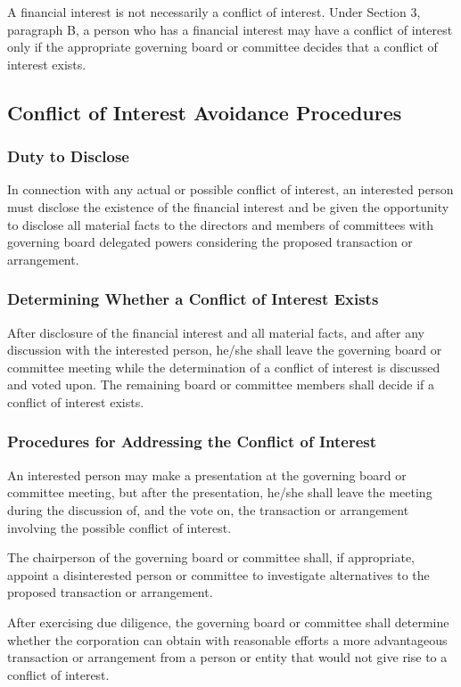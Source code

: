 \documentclass{article}
\begin{document}
		A financial interest is not necessarily a conflict of interest. Under Section 3, paragraph B, a person who has a financial interest may have a conflict of interest only if the appropriate governing board or committee decides that a conflict of interest exists.
	
	
	\subsection{Conflict of Interest Avoidance Procedures}
		\subsubsection{Duty to Disclose}
			In connection with any actual or possible conflict of interest, an interested person must disclose the existence of the financial interest and be given the opportunity to disclose all material facts to the directors and members of committees with governing board delegated powers considering the proposed transaction or arrangement.
		\subsubsection{Determining Whether a Conflict of Interest Exists}
		After disclosure of the financial interest and all material facts, and after any discussion with the interested person, he/she shall leave the governing board or committee meeting while the determination of a conflict of interest is discussed and voted upon. The remaining board or committee members shall decide if a conflict of interest exists.
		\subsubsection{Procedures for Addressing the Conflict of Interest}
		An interested person may make a presentation at the governing board or committee meeting, but after the presentation, he/she shall leave the meeting during the discussion of, and the vote on, the transaction or arrangement involving the possible conflict of interest.
		
		The chairperson of the governing board or committee shall, if appropriate, appoint a disinterested person or committee to investigate alternatives to the proposed transaction or arrangement.
		
		After exercising due diligence, the governing board or committee shall determine whether the corporation can obtain with reasonable efforts a more advantageous transaction or arrangement from a person or entity that would not give rise to a conflict of interest.
		
\end{document}
